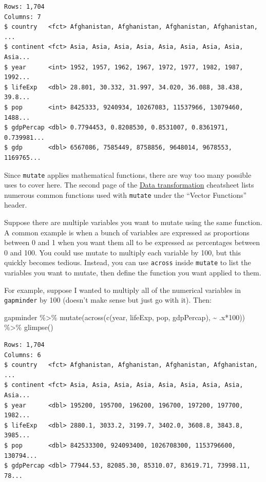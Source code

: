 \documentclass[
]{book}
\makeatletter
\newenvironment{Shaded}{\begin{snugshade}}{\end{snugshade}}
\newcommand{\DecValTok}[1]{\textcolor[rgb]{0.06,0.06,0.06}{#1}}
\newcommand{\FunctionTok}[1]{\textcolor[rgb]{0,0,0}{#1}}
\newcommand{\NormalTok}[1]{#1}
\newcommand{\SpecialCharTok}[1]{\textcolor[rgb]{0,0,0}{#1}}
\newenvironment{kframe}{%
\medskip{}
\setlength{\fboxsep}{.8em}
 \def\at@end@of@kframe{}%
 \ifinner\ifhmode%
  \def\at@end@of@kframe{\end{minipage}}%
  \begin{minipage}{\columnwidth}%
 \fi\fi%
 \def\FrameCommand##1{\hskip\@totalleftmargin \hskip-\fboxsep
 \colorbox{shadecolor}{##1}\hskip-\fboxsep
     \hskip-\linewidth \hskip-\@totalleftmargin \hskip\columnwidth}%
 \MakeFramed {\advance\hsize-\width
   \@totalleftmargin\z@ \linewidth\hsize
   \@setminipage}}%
 {\par\unskip\endMakeFramed%
 \at@end@of@kframe}
\renewenvironment{Shaded}{\begin{kframe}}{\end{kframe}}
\makeatother
\begin{document}
\begin{verbatim}
Rows: 1,704
Columns: 7
$ country   <fct> Afghanistan, Afghanistan, Afghanistan, Afghanistan, ...
$ continent <fct> Asia, Asia, Asia, Asia, Asia, Asia, Asia, Asia, Asia...
$ year      <int> 1952, 1957, 1962, 1967, 1972, 1977, 1982, 1987, 1992...
$ lifeExp   <dbl> 28.801, 30.332, 31.997, 34.020, 36.088, 38.438, 39.8...
$ pop       <int> 8425333, 9240934, 10267083, 11537966, 13079460, 1488...
$ gdpPercap <dbl> 0.7794453, 0.8208530, 0.8531007, 0.8361971, 0.739981...
$ gdp       <dbl> 6567086, 7585449, 8758856, 9648014, 9678553, 1169765...
\end{verbatim}

Since \texttt{mutate} applies mathematical functions, there are way too many possible uses to cover here. The second page of the \href{https://github.com/rstudio/cheatsheets/raw/master/data-transformation.pdf}{Data transformation} cheatsheet lists numerous common functions used with \texttt{mutate} under the ``Vector Functions'' header.

Suppose there are multiple variables you want to mutate using the same function. A common example is when a bunch of variables are expressed as proportions between 0 and 1 when you want them all to be expressed as percentages between 0 and 100. You could use mutate to multiply each variable by 100, but this quickly becomes tedious. Instead, you can use \texttt{across} inside \texttt{mutate} to list the variables you want to mutate, then define the function you want applied to them.

For example, suppose I wanted to multiply all of the numerical variables in \texttt{gapminder} by 100 (doesn't make sense but just go with it). Then:

\begin{Shaded}
\begin{Highlighting}[]
\NormalTok{gapminder }\SpecialCharTok{\%\textgreater{}\%} 
  \FunctionTok{mutate}\NormalTok{(}\FunctionTok{across}\NormalTok{(}\FunctionTok{c}\NormalTok{(year, lifeExp, pop, gdpPercap), }\SpecialCharTok{\textasciitilde{}}\NormalTok{ .x}\SpecialCharTok{*}\DecValTok{100}\NormalTok{)) }\SpecialCharTok{\%\textgreater{}\%} 
  \FunctionTok{glimpse}\NormalTok{()}
\end{Highlighting}
\end{Shaded}

\begin{verbatim}
Rows: 1,704
Columns: 6
$ country   <fct> Afghanistan, Afghanistan, Afghanistan, Afghanistan, ...
$ continent <fct> Asia, Asia, Asia, Asia, Asia, Asia, Asia, Asia, Asia...
$ year      <dbl> 195200, 195700, 196200, 196700, 197200, 197700, 1982...
$ lifeExp   <dbl> 2880.1, 3033.2, 3199.7, 3402.0, 3608.8, 3843.8, 3985...
$ pop       <dbl> 842533300, 924093400, 1026708300, 1153796600, 130794...
$ gdpPercap <dbl> 77944.53, 82085.30, 85310.07, 83619.71, 73998.11, 78...
\end{verbatim}
\end{document}
